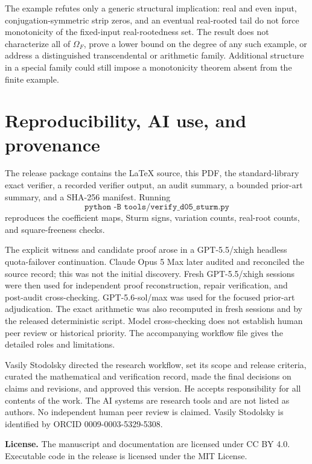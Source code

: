 \documentclass[11pt]{article}
\newcommand{\OmegaF}{\Omega_F}
\begin{document}
The example refutes only a generic structural implication: real and even
input, conjugation-symmetric strip zeros, and an eventual real-rooted tail do
not force monotonicity of the fixed-input real-rootedness set. The result does
not characterize all of $\OmegaF$, prove a lower bound on the degree of any
such example, or address a distinguished transcendental or arithmetic
family. Additional structure in a special family could still impose a
monotonicity theorem absent from the finite example.

\section{Reproducibility, AI use, and provenance}

The release package contains the LaTeX source, this PDF, the standard-library
exact verifier, a recorded verifier output, an audit summary, a bounded
prior-art summary, and a SHA-256 manifest. Running
\[
  \texttt{python -B tools/verify\_d05\_sturm.py}
\]
reproduces the coefficient maps, Sturm signs, variation counts, real-root
counts, and square-freeness checks.

The explicit witness and candidate proof arose in a GPT-5.5/xhigh headless
quota-failover continuation.
Claude Opus 5 Max later audited and reconciled the source record; this was not
the initial discovery. Fresh GPT-5.5/xhigh sessions were then used for
independent proof reconstruction, repair verification, and post-audit
cross-checking. GPT-5.6-sol/max was used for the focused prior-art
adjudication. The exact arithmetic was also recomputed in fresh sessions and
by the released deterministic script. Model cross-checking does not establish
human peer review or historical priority. The accompanying workflow file
gives the detailed roles and limitations.

Vasily Stodolsky directed the research workflow, set its scope and release
criteria, curated the mathematical and verification record, made the final
decisions on claims and revisions, and approved this version. He accepts
responsibility for all contents of the work. The AI systems are research tools
and are not listed as authors. No independent human peer review is claimed.
Vasily Stodolsky is identified by ORCID 0009-0003-5329-5308.

\medskip
\noindent\textbf{License.}
The manuscript and documentation are licensed under CC BY 4.0. Executable
code in the release is licensed under the MIT License.

\footnotesize


\end{document}
